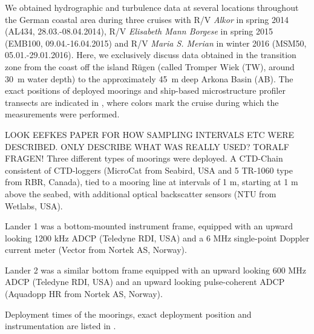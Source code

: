 We obtained hydrographic and turbulence data at several locations throughout the 
German coastal area during three cruises with R/V \textit{Alkor} in spring 2014 
(AL434, 28.03.-08.04.2014), R/V \textit{Elisabeth Mann Borgese} in spring 2015 
(EMB100, 09.04.-16.04.2015) and R/V \textit{Maria S. Merian} in winter 2016 
(MSM50, 05.01.-29.01.2016). Here, we exclusively discuss data obtained in the 
transition zone from the coast off 
the island R\"{u}gen (called Tromper Wiek (TW), around 30~m water depth) to 
the approximately 45~m deep Arkona Basin (AB). The exact positions of deployed 
moorings and ship-based microstructure profiler transects are indicated in 
, where colors mark the cruise during which the measurements 
were performed.

LOOK EEFKES PAPER FOR HOW SAMPLING INTERVALS ETC WERE DESCRIBED. ONLY 
DESCRIBE WHAT WAS REALLY USED? TORALF FRAGEN!
Three different types of moorings were deployed. A CTD-Chain consistent of 
CTD-loggers (MicroCat from Seabird, USA and 5 TR-1060 type from RBR, Canada), 
tied to a mooring line at intervals of 1 m, starting at 1 m above the seabed, 
with additional optical backscatter sensors (NTU from Wetlabs, USA).

Lander 1 was a bottom-mounted instrument frame, equipped with an upward looking 
1200 kHz ADCP (Teledyne RDI, USA) and a 6 MHz single-point Doppler current 
meter (Vector from Nortek AS, Norway).

Lander 2 was a similar bottom frame equipped with an upward looking 600 MHz 
ADCP (Teledyne RDI, USA) and an upward looking pulse-coherent ADCP (Aquadopp HR 
from Nortek AS, Norway). 

Deployment times of the moorings, exact deployment 
position and instrumentation are listed in .

